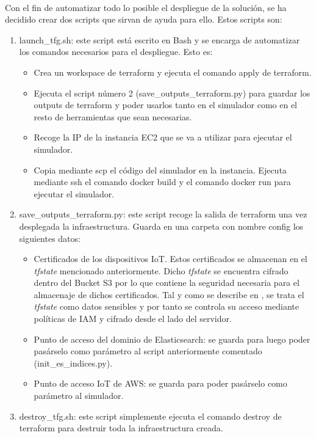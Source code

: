 \documentclass[../../memoria.tex]{subfiles}
\begin{document}
\paragraph{}
Con el fin de automatizar todo lo posible el despliegue de la solución, se ha decidido crear dos scripts que sirvan de ayuda para ello. Estos scripts son:

\begin{enumerate}
    \item launch\_tfg.sh: este script está escrito en Bash y se encarga de automatizar los comandos necesarios para el despliegue. Esto es:
          \begin{itemize}
              \item Crea un workspace de terraform y ejecuta el comando apply de terraform.
              \item Ejecuta el script número 2 (save\_outputs\_terraform.py) para guardar los outputs de terraform y poder usarlos tanto en el simulador como en el resto de herramientas que sean necesarias.
              \item Recoge la IP de la instancia EC2 que se va a utilizar para ejecutar el simulador.
              \item Copia mediante scp el código del simulador en la instancia. Ejecuta mediante ssh el comando docker build y el comando docker run para ejecutar el simulador.
          \end{itemize}

    \item save\_outputs\_terraform.py: este script recoge la salida de terraform una vez desplegada la infraestructura. Guarda en una carpeta con nombre config los siguientes datos:
          \begin{itemize}
              \item Certificados de los dispositivos IoT. Estos certificados se almacenan en el \textit{tfstate} mencionado anteriormente. Dicho \textit{tfstate} se encuentra cifrado dentro del Bucket S3 por lo que contiene la seguridad necesaria para el almacenaje de dichos certificados. Tal y como se describe en \cite{terraformsensitive}, se trata el \textit{tfstate} como datos sensibles y por tanto se controla su acceso mediante políticas de IAM y cifrado desde el lado del servidor.

              \item Punto de acceso del dominio de Elasticsearch: se guarda para luego poder pasárselo como parámetro al script anteriormente comentado (init\_es\_indices.py).

              \item Punto de acceso IoT de AWS: se guarda para poder pasárselo como parámetro al simulador.
          \end{itemize}

    \item destroy\_tfg.sh: este script simplemente ejecuta el comando destroy de terraform para destruir toda la infraestructura creada.
\end{enumerate}
\end{document}
